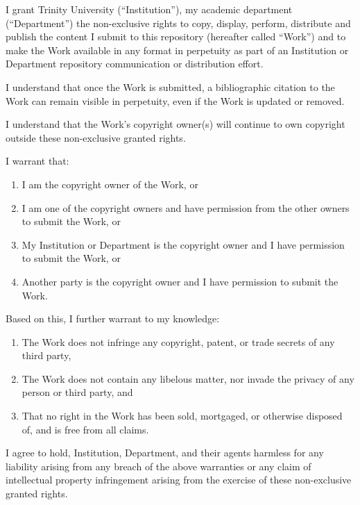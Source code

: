 \newcommand{\checkedbox}{[\makebox[1em]{X}]}
\newcommand{\emptybox}{[\makebox[1em]{}]}

\clearpage
\thispagestyle{empty}
\begingroup
\singlespacing
\setlength{\parindent}{0pt}
\renewcommand{\labelenumi}{\arabic{enumi})}

I grant Trinity University (``Institution''), my academic department
(``Department'') the non-exclusive rights to copy, display, perform, distribute
and publish the content I submit to this repository (hereafter called ``Work'')
and to make the Work available in any format in perpetuity as part of an
Institution or Department repository communication or distribution effort.

I understand that once the Work is submitted, a bibliographic citation to the
Work can remain visible in perpetuity, even if the Work is updated or removed.

I understand that the Work's copyright owner(s) will continue to own copyright
outside these non-exclusive granted rights.

I warrant that:
\begin{enumerate}
  \item I am the copyright owner of the Work, or
  \item I am one of the copyright owners and have permission from the other
        owners to submit the Work, or
  \item My Institution or Department is the copyright owner and I have
        permission to submit the Work, or
  \item Another party is the copyright owner and I have permission to submit
        the Work.
\end{enumerate}

Based on this, I further warrant to my knowledge:
\begin{enumerate}
  \item The Work does not infringe any copyright, patent, or trade secrets of
        any third party,
  \item The Work does not contain any libelous matter, nor invade the privacy
        of any person or third party, and
  \item That no right in the Work has been sold, mortgaged, or otherwise
        disposed of, and is free from all claims.
\end{enumerate}

I agree to hold, Institution, Department, and their agents harmless for any
liability arising from any breach of the above warranties or any claim of
intellectual property infringement arising from the exercise of these
non-exclusive granted rights.

